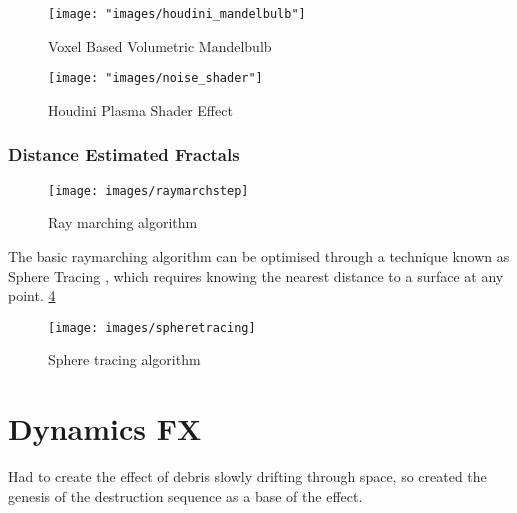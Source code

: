\documentclass[11pt,a4paper,final,notitlepage]{report}
\begin{document}
\begin{figure}
\begin{center}
\texttt{[image: "images/houdini\_mandelbulb"]}
\caption{Voxel Based Volumetric Mandelbulb}
\label{fig:voxelbulb}
\end{center}
\end{figure}

\begin{figure}
\begin{center}
\texttt{[image: "images/noise\_shader"]}
\caption{Houdini Plasma Shader Effect}
\label{fig:noise_shader}
\end{center}
\end{figure}


\subsection{Distance Estimated Fractals}


\begin{figure}
\begin{center}
\texttt{[image: images/raymarchstep]}
\caption{Ray marching algorithm}
\label{fig:raymarching}
\end{center}
\end{figure}

The basic raymarching algorithm can be optimised through a technique known as Sphere Tracing \cite{Hart1996}, which requires knowing the nearest distance to a surface at any point. \ref{fig:sphere_tracing}

\begin{figure}
\begin{center}
\texttt{[image: images/spheretracing]}
\caption{Sphere tracing algorithm}
\label{fig:sphere_tracing}
\end{center}
\end{figure}





\chapter{Dynamics FX}

Had to create the effect of debris slowly drifting through space, so created the genesis of the destruction sequence as a base of the effect.
\end{document}
